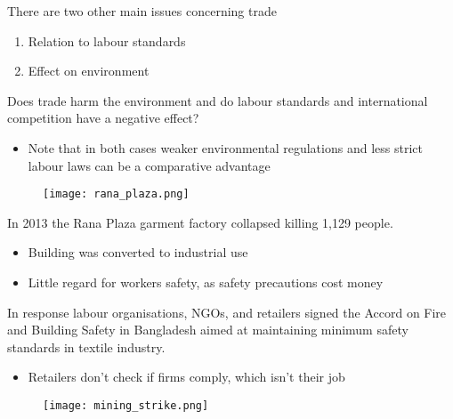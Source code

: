\documentclass{beamer}
\begin{document}
\begin{frame}
  There are two other main issues concerning trade
  \begin{enumerate}
    \item Relation to labour standards
    \item Effect on environment    
  \end{enumerate}
  \medskip
  Does trade harm the environment and do labour standards and international competition have a negative effect?
  \begin{itemize}
    \item Note that in both cases weaker environmental regulations and less strict labour laws can be a comparative advantage
  \end{itemize}
\end{frame}

\begin{frame}
  \begin{figure}
    \texttt{[image: rana\_plaza.png]}
  \end{figure}
\end{frame}

\begin{frame}
  In 2013 the Rana Plaza garment factory collapsed killing 1,129 people. 
  \begin{itemize}
    \item Building was converted to industrial use
    \item Little regard for workers safety, as safety precautions cost money
  \end{itemize}
  \medskip
  In response labour organisations, NGOs, and retailers signed the Accord on Fire and Building Safety in Bangladesh aimed at maintaining minimum safety standards in textile industry.
  \begin{itemize}
    \item Retailers don't check if firms comply, which isn't their job
  \end{itemize}
\end{frame}

\begin{frame}
  \begin{figure}
    \texttt{[image: mining\_strike.png]}
  \end{figure}
\end{frame}
\end{document}
